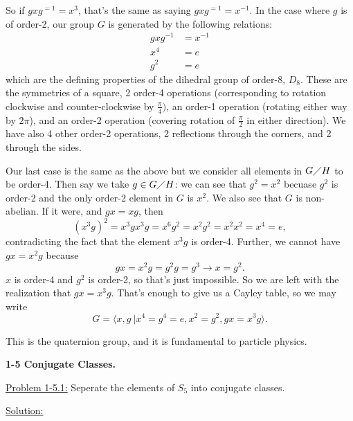 \documentclass[12pt]{article}
\begin{document}
So if $gxg^{=1} = x^3$, that's the same as saying $gxg^{=1} = x^{-1}$. In the
case where $g$ is of order-2, our group $G$ is generated by the following
relations:
\begin{align*}
    gxg^{-1} &= x^{-1}\\
         x^4 &= e\\
         g^2 &=e
\end{align*}
which are the defining properties of the dihedral group of order-8, $D_8$.
These are the symmetries of a square, 2 order-4 operations (corresponding to
rotation clockwise and counter-clockwise by $\frac{\pi}{4})$, an order-1
operation (rotating either way by  $2\pi$), and an order-2 operation (covering
rotation of  $\frac{\pi}{2}$ in either direction). We have also 4 other
order-2 operations, 2 reflections through the corners, and 2 through the sides.

Our last case is the same as the above but we consider all elements in
$G \diagup H$ to be order-4. Then say we take $g \in G \diagup H$: we can see
that $g^2 = x^2$ becuase $g^2$ is order-2 and the only order-2 element in $G$
is $x^2$. We also see that $G$ is non-abelian. If it were, and $gx = xg$, then
\[
    (x^3g)^2 = x^3gx^3g = x^6g^2 = x^2g^2 = x^2x^2 = x^4 = e, 
\]
contradicting the fact that the element $x^3g$ is order-4. Further, we cannot
have $gx = x^2g$ because
\[
gx = x^2g = g^2g = g^3 \rightarrow x = g^2.
\]
$x$ is order-4 and $g^2$ is order-2, so that's just impossible. So we are left
with the realization that $gx = x^3g$. That's enough to give us a Cayley table,
so we may write
\[
 G = \langle x, g\ | x^4 = g^4 = e, x^2 = g^2, gx = x^3g \rangle.
\]

This is the quaternion group, and it is fundamental to particle physics.

\newpage

\textbf{1-5 Conjugate Classes.}

\underline{Problem 1-5.1:} Seperate the elements of $S_5$ into conjugate
classes.

\underline{Solution:}
\end{document}
